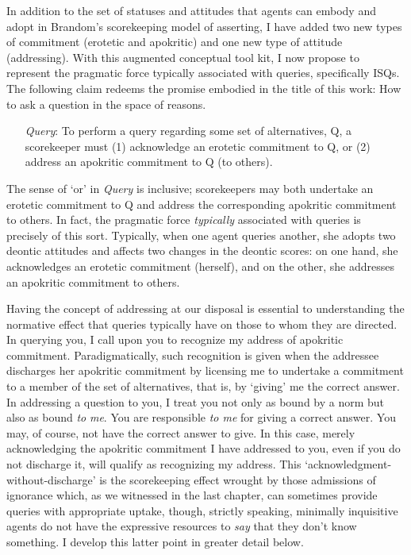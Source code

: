 \documentclass{article}                     %
\begin{document}
In addition to the set of statuses and attitudes that agents can embody
and adopt in Brandom's scorekeeping model of asserting, I have added
two new types of commitment (erotetic and apokritic) and one new type
of attitude (addressing). With this augmented conceptual tool kit,
I now propose to represent the pragmatic force typically associated
with queries, specifically ISQs. The following claim redeems the promise
embodied in the title of this work: How to ask a question in the space
of reasons.
\begin{itemize}
\item [{\emph{Query}:}] To perform a query regarding some set of alternatives,
Q, a scorekeeper must (1) acknowledge an erotetic commitment to Q,
or (2) address an apokritic commitment to Q (to others).
\end{itemize}

The sense of `or' in \emph{Query} is inclusive; scorekeepers may
both undertake an erotetic commitment to Q and address the corresponding
apokritic commitment to others. In fact, the pragmatic force \emph{typically}
associated with queries is precisely of this sort. Typically, when
one agent queries another, she adopts two deontic attitudes and affects
two changes in the deontic scores: on one hand, she acknowledges an
erotetic commitment (herself), and on the other, she addresses an
apokritic commitment to others.

Having the concept of addressing at our disposal is essential to understanding
the normative effect that queries typically have on those to whom
they are directed. In querying you, I call upon you to recognize my
address of apokritic commitment. Paradigmatically, such recognition
is given when the addressee discharges her apokritic commitment by
licensing me to undertake a commitment to a member of the set of alternatives,
that is, by `giving' me the correct answer. In addressing a question
to you, I treat you not only as bound by a norm but also as bound
\emph{to} \emph{me}. You are responsible \emph{to me} for giving a
correct answer. You may, of course, not have the correct answer to
give. In this case, merely acknowledging the apokritic commitment
I have addressed to you, even if you do not discharge it, will qualify
as recognizing my address. This `acknowledgment-without-discharge'
is the scorekeeping effect wrought by those admissions of ignorance
which, as we witnessed in the last chapter, can sometimes provide
queries with appropriate uptake, though, strictly speaking, minimally
inquisitive agents do not have the expressive resources to \emph{say}
that they don't know something. I develop this latter point in greater
detail below.
\end{document}
